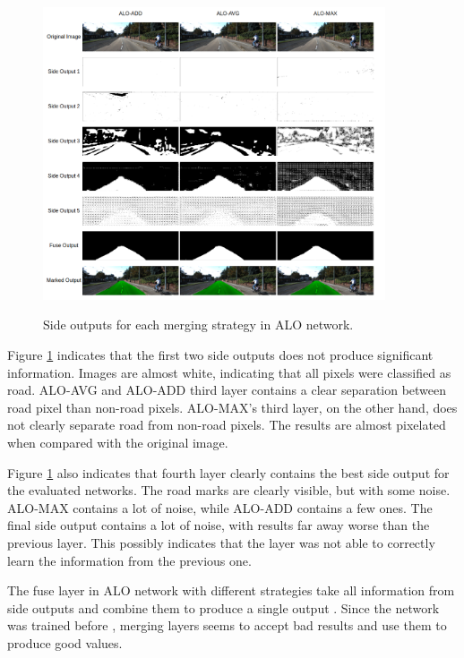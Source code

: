 \begin{figure}
  \caption{Side outputs for each merging strategy in ALO network.}
  \centering
  \includegraphics[width=0.9\textwidth]{figures/falreis/side_outputs.png}
  \label{fig:side_outputs}
\end{figure}


Figure \ref{fig:side_outputs} indicates that the first two side outputs does not produce significant information. Images are almost white, indicating that all pixels were classified as road. ALO-AVG and ALO-ADD third layer contains a clear separation between road pixel than non-road pixels. ALO-MAX's third layer, on the other hand, does not clearly separate road from non-road pixels. The results are almost pixelated when compared with the original image.

Figure \ref{fig:side_outputs} also indicates that fourth layer clearly contains the best side output for the evaluated networks. The road marks are clearly visible, but with some noise. ALO-MAX contains a lot of noise, while ALO-ADD contains a few ones. The final side output contains a lot of noise, with results far away worse than the previous layer. This possibly indicates that the layer was not able to correctly learn the information from the previous one.

The fuse layer in ALO network with different strategies take all information from side outputs and combine them to produce a single output . Since the network was trained before , merging layers  seems to accept bad results and use them to produce good values.

